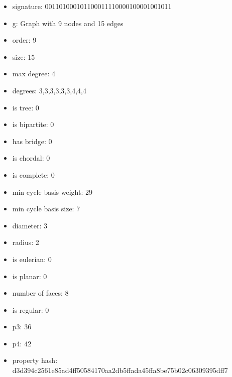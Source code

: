 \begin{figure}
\end{figure}
\begin{itemize}
\item signature: 001101000101100011110000100001001011
\item g: Graph with 9 nodes and 15 edges
\item order: 9
\item size: 15
\item max degree: 4
\item degrees: 3,3,3,3,3,3,4,4,4
\item is tree: 0
\item is bipartite: 0
\item has bridge: 0
\item is chordal: 0
\item is complete: 0
\item min cycle basis weight: 29
\item min cycle basis size: 7
\item diameter: 3
\item radius: 2
\item is eulerian: 0
\item is planar: 0
\item number of faces: 8
\item is regular: 0
\item p3: 36
\item p4: 42
\item property hash: d3d394c2561e85ad4ff50584170aa2db5ffada45ffa8be75b02c06309395dff7
\end{itemize}
\newpage
